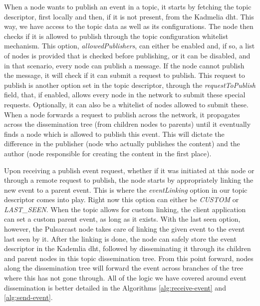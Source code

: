 When a node wants to publish an event in a topic, it starts by fetching the
topic descriptor, first locally and then, if it is not present, from the
Kadmelia \acrshort{dht}.  This way, we have access to the topic data as well as its
configurations. The node then checks if it is allowed to publish through the
topic configuration whitelist mechanism. This option, \emph{allowedPublishers},
can either be enabled and, if so, a list of nodes is provided that is checked
before publishing, or it can be disabled, and in that scenario, every node can
publish a message. If the node cannot publish the message, it will check if it
can submit a request to publish. This request to publish is another option set
in the topic descriptor, through the \emph{requestToPublish} field, that, if
enabled, allows every node in the network to submit these special requests.
Optionally, it can also be a whitelist of nodes allowed to submit these. When a
node forwards a request to publish across the network, it propagates across the
dissemination tree (from children nodes to parents) until it eventually finds a
node which is allowed to publish this event. This will dictate the difference
in the publisher (node who actually publishes the content) and the author (node
responsible for creating the content in the first place).

Upon receiving a publish event request, whether if it was initiated at this
node or through a remote request to publish, the node starts by appropriately
linking the new event to a parent event. This is where the \emph{eventLinking}
option in our topic descriptor comes into play. Right now this option can
either be \emph{CUSTOM} or \emph{LAST\_SEEN}. When the topic allows for custom
linking, the client application can set a custom parent event, as long as it
exists. With the last seen option, however, the Pulsarcast node takes care of
linking the given event to the event last seen by it. After the linking is
done, the node can safely store the event descriptor in the Kademlia \acrshort{dht},
followed by disseminating it through its children and parent nodes in this
topic dissemination tree. From this point forward, nodes along the
dissemination tree will forward the event across branches of the tree where
this has not gone through. All of the logic we have covered around event
dissemination is better detailed in the Algorithms \ref{alg:receive-event} and
\ref{alg:send-event}.

